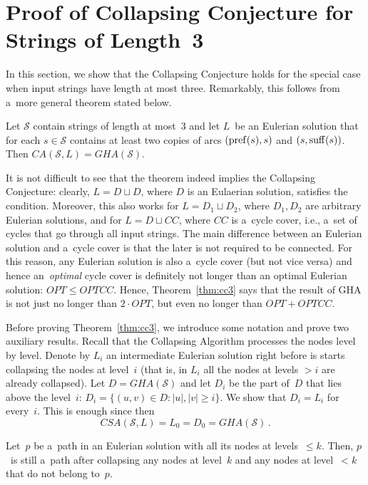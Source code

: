 \section{Proof of Collapsing Conjecture for Strings of Length~3}
\label{subsec:scs3}
In this section, we show that the Collapsing Conjecture holds for 
the special case
when input strings have length at most three. 
Remarkably, this follows from a~more general theorem stated below.

\begin{theorem}\label{thm:cc3}
Let $\mathcal{S}$ contain strings of length at most~3 and let $L$~be an Eulerian solution that for each $s \in \mathcal{S}$ contains at least two copies of arcs $(\operatorname{pref}(s), s)$ and $(s, \operatorname{suff}(s))$. Then $CA(\mathcal{S}, L)=GHA(\mathcal{S})$.
\end{theorem}

It is not difficult to see that the theorem indeed implies the Collapsing Conjecture: clearly, $L=D \sqcup D$, where $D$ is an Eulaerian solution, satisfies the condition. Moreover, this also works for $L=D_1 \sqcup D_2$, where $D_1, D_2$ are arbitrary Eulerian solutions, and for $L=D \sqcup CC$, where $CC$ is a~cycle cover, i.e., a~set of cycles that go through all input strings. The main difference between an Eulerian solution and a~cycle cover is that the later is not required to be connected. For this reason, any Eulerian solution is also a~cycle cover (but not vice versa) and hence an~{\em optimal} cycle cover is definitely not longer than an optimal Eulerian solution: $OPT \le OPTCC$. Hence, Theorem~\ref{thm:cc3} says that the result of GHA is not just no longer than $2\cdot OPT$, but even no longer than $OPT+OPTCC$.

Before proving Theorem~\ref{thm:cc3}, we introduce some notation and 
prove two auxiliary results. Recall that the Collapsing Algorithm processes the nodes level by level. Denote by $L_i$ an intermediate Eulerian solution right before is starts collapsing the nodes at level~$i$ (that is, in $L_i$ all the nodes at levels $>i$ are already collapsed). Let $D=GHA(\mathcal{S})$ and let $D_i$ be 
the part of~$D$ that lies above the level~$i$: $D_i=\{(u, v) \in D \colon |u|, |v| \ge i\}$. We show that $D_i=L_i$ for every~$i$. This is enough since then \[CSA(\mathcal{S}, L)=L_0=D_0=GHA(\mathcal{S}) \, .\]

\begin{claim}\label{clm:path}
Let~$p$ be a~path in an Eulerian solution with all its nodes at levels~$\le k$. Then, $p$~is still a~path after collapsing any nodes at level~$k$ and any nodes at level~$<k$ that do not belong to~$p$.
\end{claim}

